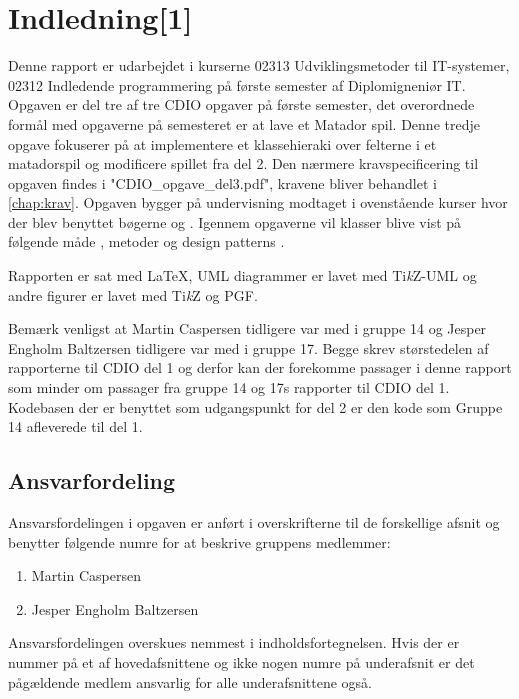 \chapter{Indledning[1]}\label{chap:indledning}
Denne rapport er udarbejdet i kurserne 02313 Udviklingsmetoder til IT-systemer, 02312 Indledende programmering på første semester af Diplomigneniør IT. Opgaven er del tre af tre CDIO opgaver på første semester, det overordnede formål med opgaverne på semesteret er at lave et Matador spil. Denne tredje opgave fokuserer på at implementere et klassehieraki over felterne i et matadorspil og modificere spillet fra del 2. Den nærmere kravspecificering til opgaven findes i "CDIO\_opgave\_del3.pdf"\cite{CDIOdel3}, kravene bliver behandlet i \vref{chap:krav}. Opgaven bygger på undervisning modtaget i ovenstående kurser hvor der blev benyttet bøgerne \cite{umlbook} og \cite{javabook}. Igennem opgaverne vil klasser blive vist på følgende måde , metoder  og design patterns .

Rapporten er sat med \LaTeX, UML diagrammer er lavet med Ti\emph{k}Z-UML og andre figurer er lavet med Ti\emph{k}Z og \textsc{PGF}.

Bemærk venligst at Martin Caspersen tidligere var med i gruppe 14 og Jesper Engholm Baltzersen tidligere var med i gruppe 17. Begge skrev størstedelen af rapporterne til CDIO del 1 og derfor kan der forekomme passager i denne rapport som minder om passager fra gruppe 14 og 17s rapporter til CDIO del 1. Kodebasen der er benyttet som udgangspunkt for del 2 er den kode som Gruppe 14 afleverede til del 1.

\section{Ansvarfordeling}\label{sec:indledning:ansvarsfordeling}

Ansvarsfordelingen i opgaven er anført i overskrifterne til de forskellige afsnit og benytter følgende numre for at beskrive gruppens medlemmer:
\begin{enumerate}
\item Martin Caspersen
\item Jesper Engholm Baltzersen
\end{enumerate}
Ansvarsfordelingen overskues nemmest i indholdsfortegnelsen. Hvis der er nummer på et af hovedafsnittene og ikke nogen numre på underafsnit er det pågældende medlem ansvarlig for alle underafsnittene også.

